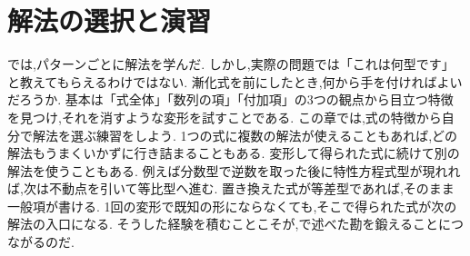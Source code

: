 
\chapter{解法の選択と演習}\label{章：解法の選択と演習}
\begin{bookcolumns}

  では,パターンごとに解法を学んだ.
  しかし,実際の問題では「これは何型です」と教えてもらえるわけではない.
  漸化式を前にしたとき,何から手を付ければよいだろうか.
  基本は「式全体」「数列の項」「付加項」の3つの観点から目立つ特徴を見つけ,それを消すような変形を試すことである.
  この章では,式の特徴から自分で解法を選ぶ練習をしよう.
  1つの式に複数の解法が使えることもあれば,どの解法もうまくいかずに行き詰まることもある.
  変形して得られた式に続けて別の解法を使うこともある.
  例えば分数型で逆数を取った後に特性方程式型が現れれば,次は不動点を引いて等比型へ進む.
  置き換えた式が等差型であれば,そのまま一般項が書ける.
  1回の変形で既知の形にならなくても,そこで得られた式が次の解法の入口になる.
  そうした経験を積むことこそが,で述べた勘を鍛えることにつながるのだ.

\end{bookcolumns}
